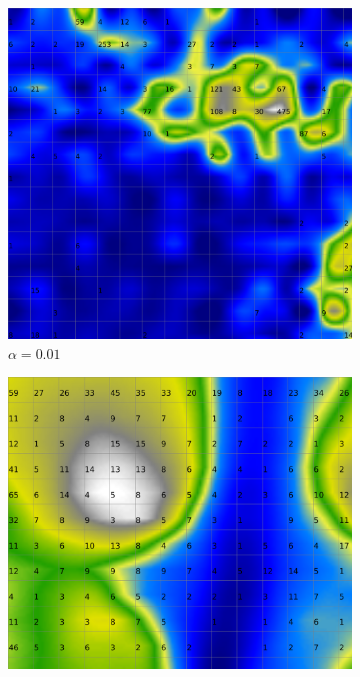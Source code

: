 \documentclass{acm_proc_article-sp}
\begin{document}
\begin{figure}
\centering
    \centering
    \begin{subfigure}[b]{0.24\linewidth}
        \includegraphics[width=\linewidth]{img/wine-20x16-smoothed-data-histogram-alpha-0,01-f-50}
        \caption{$\alpha=0.01$}
        \label{fig:wine-20x16-smoothed-data-histogram-alpha-0,01-f-50}
    \end{subfigure}
    \begin{subfigure}[b]{0.24\linewidth}
        \includegraphics[width=\linewidth]{img/wine-20x16-smoothed-data-histogram-alpha-0,45-f-50}

\end{subfigure}
\end{figure}
\end{document}
